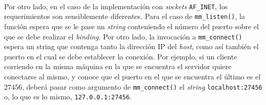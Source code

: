 \documentclass[spanish]{article}
\begin{document}
\paragraph{} Por otro lado, en el caso de la implementación con \textit{sockets} \verb|AF_INET|, los requerimientos son sensiblemente diferentes. Para el caso de \verb|mm_listen()|, la función espera que se le pase un \textit{string} conteniendo el número del puerto sobre el que se debe realizar el \textit{binding}. Por otro lado, la invocación a \verb|mm_connect()| espera un string que contenga tanto la dirección IP del \textit{host}, como así también el puerto en el cual se debe establecer la conexión. Por ejemplo, si un cliente corriendo en la misma máquina en la que se encuentra el servidor quiere conectarse al mismo, y conoce que el puerto en el que se encuentra el último es el $27456$, deberá pasar como argumento de \verb|mm_connect()| el \textit{string} \verb|localhost:27456| o, lo que es lo mismo, \verb|127.0.0.1:27456|. 
\end{document}
